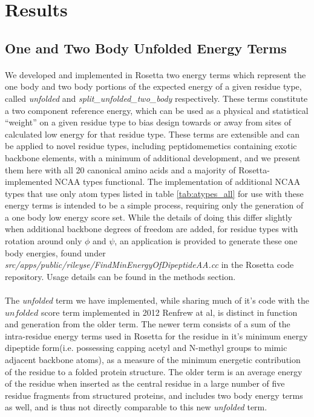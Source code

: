 \section{Results}


\subsection{One and Two Body Unfolded Energy Terms}
\paragraph{}
We developed and implemented in Rosetta two energy terms which represent the one body and two body portions of the expected energy of a given residue type, called \textit{unfolded} and \textit{split\_unfolded\_two\_body} respectively. 
These terms constitute a two component reference energy, which can be used as a physical and statistical ``weight'' on a given residue type to bias design towards or away from sites of calculated low energy for that residue type.
These terms are extensible and can be applied to novel residue types, including peptidomemetics containing exotic backbone elements, with a minimum of additional development, and we present them here with all 20 canonical amino acids and a majority of Rosetta-implemented NCAA types functional.
The implementation of additional NCAA types that use only atom types listed in table \ref{tab:atypes_all} for use with these energy terms is intended to be a simple process, requiring only the generation of a one body low energy score set.
While the details of doing this differ slightly when additional backbone degrees of freedom are added, for residue types with rotation around only $\phi$ and $\psi$, an application is provided to generate these one body energies, found under \textit{src/apps/public/rileyse/FindMinEnergyOfDipeptideAA.cc} in the Rosetta code repository.
Usage details can be found in the methods section.

\paragraph{}
The \textit{unfolded} term we have implemented, while sharing much of it's code with the $unfolded$ score term implemented in 2012 Renfrew at al\cite{renfrew_incorporation_2012}, is distinct in function and generation from the older term.
The newer term consists of a sum of the intra-residue energy terms used in Rosetta for the residue in it's minimum energy dipeptide form(i.e. possessing capping acetyl and N-methyl groups to mimic adjacent backbone atoms), as a measure of the minimum energetic contribution of the residue to a folded protein structure.
The older term is an average energy of the residue when inserted as the central residue in a large number of five residue fragments from structured proteins, and includes two body energy terms as well, and is thus not directly comparable to this new \textit{unfolded} term.


